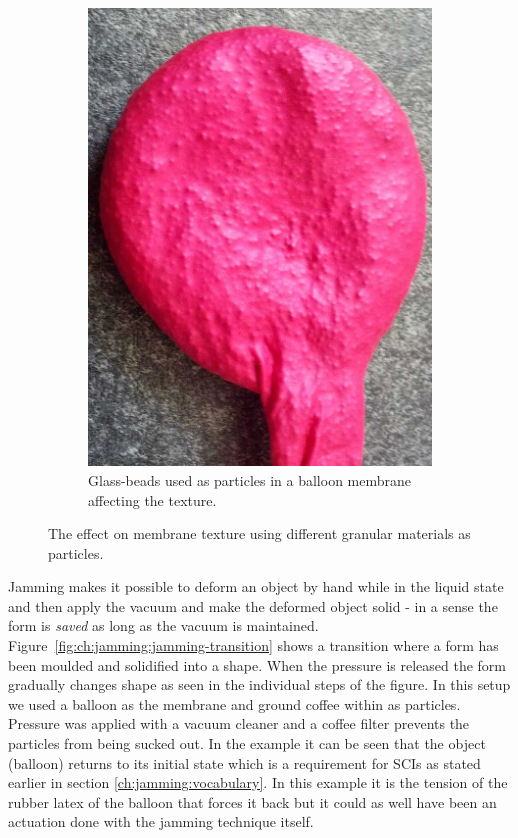 \begin{figure}[h]
\begin{subfigure}[b]{.44\textwidth}
  \includegraphics[width=\linewidth]{figures/jamming/balloon-glass-beads}
  \caption{Glass-beads used as particles in a balloon membrane affecting the texture.}
\end{subfigure}
\caption{The effect on membrane texture using different granular materials as particles.}
\label{fig:ch:jamming:particles:balloon}
\end{figure}

Jamming makes it possible to deform an object by hand while in the liquid state and then apply the vacuum and make the deformed object solid - in a sense the form is \emph{saved} as long as the vacuum is maintained.
Figure~\ref{fig:ch:jamming:jamming-transition} shows a transition where a form has been moulded and solidified into a shape.
When the pressure is released the form gradually changes shape as seen in the individual steps of the figure.
In this setup we used a balloon as the membrane and ground coffee within as particles.
Pressure was applied with a vacuum cleaner and a coffee filter prevents the particles from being sucked out.
In the example it can be seen that the object (balloon) returns to its initial state which is a requirement for SCIs as stated earlier in section \ref{ch:jamming:vocabulary}.
In this example it is the tension of the rubber latex of the balloon that forces it back but it could as well have been an actuation done with the jamming technique itself. 

